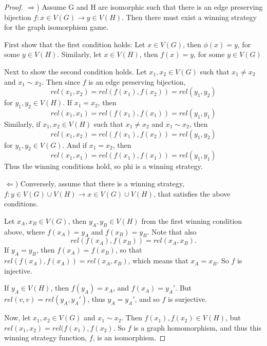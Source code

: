 \documentclass[12pt]{article}
\begin{document}
\begin{proof}
$\Rightarrow$) Assume G and H are isomorphic such that there is an
  edge preserving bijection $f: x \in V(G) \to y \in V(H)$. Then there
  must exist a winning strategy for the graph isomorphism game.

First show that the first condition holds: Let $x \in V(G)$, then
$\phi(x) = y$, for some $y \in V(H)$. Similarly, let $x \in V(H)$,
then $f(x) = y$, for some $y \in V(G)$

Next to show the second condition holds. Let $x_1, x_2 \in V(G)$ such
that $x_1 \neq x_2$ and $x_1 \sim x_2$. Then since $f$ is an edge
preserving bijection,
\begin{equation}
rel(x_1, x_2) = rel(f(x_1), f(x_2)) = rel(y_1, y_2)
\end{equation}
for $y_1, y_2 \in V(H)$. If $x_1 = x_2$, then
\begin{equation}
rel(x_1, x_1) = rel(f(x_1), f(x_1)) = rel(y_1, y_1)
\end{equation}
Similarly, if $x_1, x_2 \in V(H)$ such that $x_1 \neq x_2$ and $x_1
\sim x_2$, then
\begin{equation}
rel(x_1, x_2) = rel(f(x_1), f(x_2)) = rel(y_1, y_2)
\end{equation}
for $y_1, y_2 \in V(G)$. And if $x_1 = x_2$, then
\begin{equation}
rel(x_1, x_1) = rel(f(x_1), f(x_1)) = rel(y_1, y_1)
\end{equation}
Thus the winning conditions hold, so phi is a winning strategy.

$\Leftarrow$) Conversely, assume that there is a winning strategy, $f:
y \in V(G)\cup V(H) \to x \in V(G) \cup V(H)$, that satisfies the
above conditions.

Let $x_A, x_B \in V(G)$, then $y_A, y_B \in V(H)$ from the first
winning condition above, where $f(x_A) = y_A$ and $f(x_B) = y_B$. Note
that also 
\[
rel(f(x_A), f(x_B)) = rel(x_A, x_B).
\] 
If $y_A = y_B$, then
$f(x_A) = f(x_B)$, so that $rel(f(x_A), f(x_A)) = rel(x_A, x_B)$,
which means that $x_A = x_B$. So $f$ is injective.

If $y_A \in V(H)$, then $f(y_A) = x_A$, and $f(x_A) = y_A'$. But
$rel(v, v) = rel(y_A, y_A')$, thus $y_A = y_A'$, and so $f$ is
surjective.

Now, let $x_1, x_2 \in V(G)$ and $x_1 \sim x_2$. Then $f(x_1), f(x_2)
\in V(H)$, but $rel(x_1, x_2) = rel(f(x_1), f(x_2)$. So $f$ is a graph
homomorphism, and thus this winning strategy function, $f$, is an
isomorphism.
\end{proof}
\end{document}
